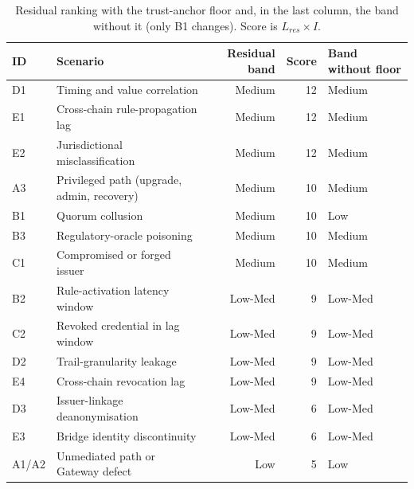 \begin{table}[t]
\centering\small
\caption{Residual ranking with the trust-anchor floor and, in the last column, the band without it (only B1 changes). Score is $L_{res}\times I$.}
\label{tab:floor}
\begin{tabular}{llrrl}
\toprule
ID & Scenario & Residual band & Score & Band without floor \\
\midrule
D1 & Timing and value correlation & Medium & 12 & Medium \\
E1 & Cross-chain rule-propagation lag & Medium & 12 & Medium \\
E2 & Jurisdictional misclassification & Medium & 12 & Medium \\
A3 & Privileged path (upgrade, admin, recovery) & Medium & 10 & Medium \\
B1 & Quorum collusion & Medium & 10 & Low \\
B3 & Regulatory-oracle poisoning & Medium & 10 & Medium \\
C1 & Compromised or forged issuer & Medium & 10 & Medium \\
B2 & Rule-activation latency window & Low-Med & 9 & Low-Med \\
C2 & Revoked credential in lag window & Low-Med & 9 & Low-Med \\
D2 & Trail-granularity leakage & Low-Med & 9 & Low-Med \\
E4 & Cross-chain revocation lag & Low-Med & 9 & Low-Med \\
D3 & Issuer-linkage deanonymisation & Low-Med & 6 & Low-Med \\
E3 & Bridge identity discontinuity & Low-Med & 6 & Low-Med \\
A1/A2 & Unmediated path or Gateway defect & Low & 5 & Low \\
\bottomrule
\end{tabular}
\end{table}
